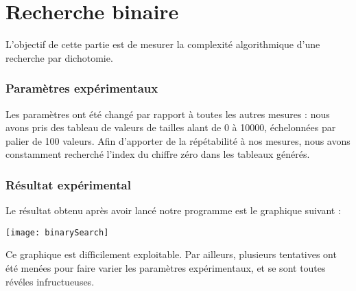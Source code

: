 \part{Recherche binaire}
  L'objectif de cette partie est de mesurer la complexité algorithmique d'une recherche par dichotomie.

  \section{Paramètres expérimentaux}

    Les paramètres ont été changé par rapport à toutes les autres mesures : nous avons pris des tableau de valeurs
     de tailles alant de 0 à 10000, échelonnées par palier de 100 valeurs. Afin d'apporter de la répétabilité à nos mesures,
     nous avons constamment recherché l'index du chiffre zéro dans les tableaux générés.

  \section{Résultat expérimental}

    Le résultat obtenu après avoir lancé notre programme est le graphique suivant :

    \begin{center}
      \texttt{[image: binarySearch]}
    \end{center}

    Ce graphique est difficilement exploitable. Par ailleurs, plusieurs tentatives ont été menées pour faire varier les paramètres
    expérimentaux, et se sont toutes révéles infructueuses.
